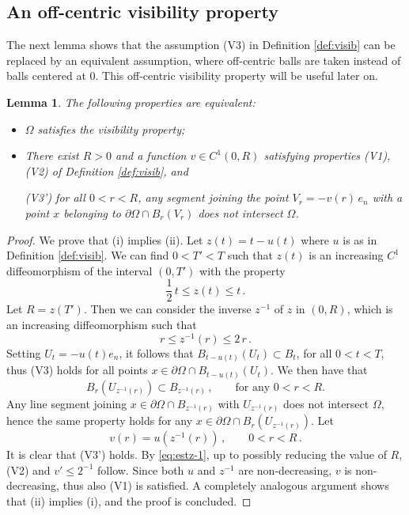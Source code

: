 \documentclass[a4paper,reqno,11pt]{amsart}
\newtheorem{lemma}[theorem]{Lemma}
\newcommand{\de}{\partial}
\begin{document}
\subsection{An off-centric visibility property}
The next lemma shows that the assumption (V3) in Definition \ref{def:visib} can be replaced by an equivalent assumption, where off-centric balls are taken instead of balls centered at $0$. This off-centric visibility property will be useful later on. 
\begin{lemma} \label{lem:visibalt}
The following properties are equivalent:
\begin{itemize}
\item[(i)] $\Omega$ satisfies the visibility property;
\item[(ii)] There exist $R > 0$ and a function $v \in C^{1}(0,R)$ satisfying properties (V1), (V2) of Definition \ref{def:visib}, and
\begin{center}
\begin{minipage}{.8\textwidth}
(V3') for all $0 < r < R$, any segment joining the point $V_r = -v(r) \, e_{n}$ with a point $x$ belonging to $\de \Omega \cap B_{r}(V_r)$ does not intersect $\Omega$.
\end{minipage}
\end{center}
\end{itemize}
\end{lemma}
\begin{proof}
We prove that (i) implies (ii). Let $z(t) = t - u(t)$ where $u$ is as in Definition \ref{def:visib}. We can find $0 < T' < T$ such that $z(t)$ is an increasing $C^1$ diffeomorphism of the interval $(0,T')$ with the property
\begin{equation*}
\dfrac{1}{2} \, t \leq z(t) \leq t \, .
\end{equation*}
Let $R = z(T')$. Then we can consider the inverse $z^{-1}$ of $z$ in $(0,R)$, which is an increasing diffeomorphism such that
\begin{equation} \label{eq:estz-1}
r \leq z^{-1}(r) \leq 2 \, r \, .
\end{equation}
Setting $U_t = - u(t) e_n$, it follows that $B_{t - u(t)}(U_t) \subset B_{t}$, for all $0 < t < T$, thus (V3) holds for all points $x \in \de \Omega \cap B_{t - u(t)}(U_t)$. We then have that
\begin{equation*}
B_{r}(U_{z^{-1}(r)}) \subset B_{z^{-1}(r)} \, , \qquad \text{for any $0 < r < R$.}
\end{equation*}
Any line segment joining $x \in \de \Omega \cap B_{z^{-1}(r)}$ with $U_{z^{-1}(r)}$ does not intersect $\Omega$, hence the same property holds for any $x \in \de \Omega \cap B_{r}(U_{z^{-1}(r)})$. Let
\begin{equation*}
v(r) = u(z^{-1}(r)) \, , \qquad 0 < r < R \, .
\end{equation*}
It is clear that (V3') holds. By \eqref{eq:estz-1}, up to possibly reducing the value of $R$, (V2) and $v' \leq 2^{-1}$ follow. Since both $u$ and $z^{-1}$ are non-decreasing, $v$ is non-decreasing, thus also (V1) is satisfied. A completely analogous argument shows that (ii) implies (i), and the proof is concluded.
\end{proof}
\end{document}
